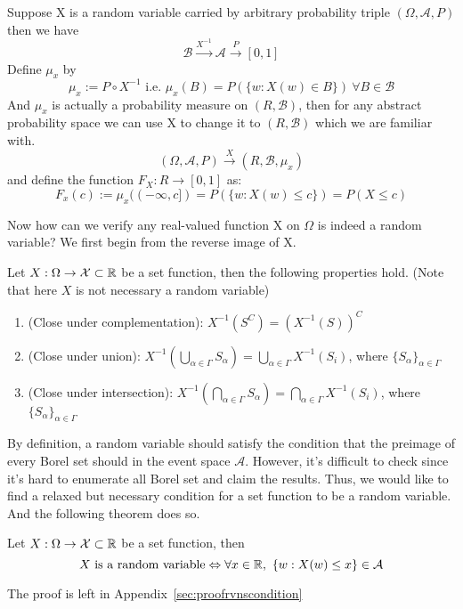 \documentclass[Probability_Theory.tex]{subfiles}
\begin{document}
\begin{intuition}
Suppose X is a random variable carried by arbitrary probability triple $(\Omega,\mathcal{A},P)$ then we have $$\mathcal{B}\xrightarrow{X^{-1}} \mathcal{A} \xrightarrow{P} [0,1]$$
Define $\mu_x$ by 
$$\mu_x:=P\circ X^{-1} \text{  i.e.  } \mu_x(B)=P(\{w:X(w)\in B\})\  \forall B\in \mathcal{B}$$
And $\mu_x$ is actually a probability measure on $(R,\mathcal{B})$, then for any abstract probability space we can use X to change it to $(R,\mathcal{B})$ which we are familiar with. 
$$(\Omega,\mathcal{A},P)\xrightarrow{X} (R,\mathcal{B},\mu_x)$$ and define the function $F_X:R\rightarrow [0,1]$ as: 
$$F_x(c):=\mu_x((-\infty,c])=P(\{w:X(w)\leq c\})=P(X\leq c)$$
\end{intuition}
Now how can we verify any real-valued function X on $\Omega$ is indeed a random variable? We first begin from the reverse image of X. 
\begin{property}\label{propertyofsetfuncs}
	Let $X:\Omega\rightarrow\mathcal{X}\subset{\mathbb R}$ be a set function, then the following properties hold. (Note that here $X$ is not necessary a random variable)
	\begin{enumerate}
		\item (Close under complementation): $X^{-1}(S^C) = (X^{-1}(S))^C$
		\item (Close under union): $X^{-1}(\bigcup_{\alpha\in\Gamma}S_{\alpha}) = \bigcup_{\alpha\in\Gamma}X^{-1}(S_i)$, where $\{S_{\alpha}\}_{\alpha\in\Gamma}$
		\item (Close under intersection): $X^{-1}(\bigcap_{\alpha\in\Gamma}S_{\alpha}) = \bigcap_{\alpha\in\Gamma}X^{-1}(S_i)$, where $\{S_{\alpha}\}_{\alpha\in\Gamma}$
	\end{enumerate}
\end{property}

By definition, a random variable should satisfy the condition that the preimage of every Borel set should in the event space $\mathcal{A}$. However, it's difficult to check since it's hard to enumerate all Borel set and claim the results. Thus, we would like to find a relaxed but necessary condition for a set function to be a random variable. And the following theorem does so.

\begin{theorem}\label{rvnscondition}
	Let $X:\Omega\rightarrow\mathcal{X}\subset{\mathbb R}$ be a set function, then
	$$X\mbox{ is a random variable}\Leftrightarrow \forall x\in{\mathbb R},\ \{w:X(w)\leq x\}\in\mathcal{A}$$
\end{theorem}
The proof is left in Appendix~\ref{sec:proofrvnscondition}
\end{document}

